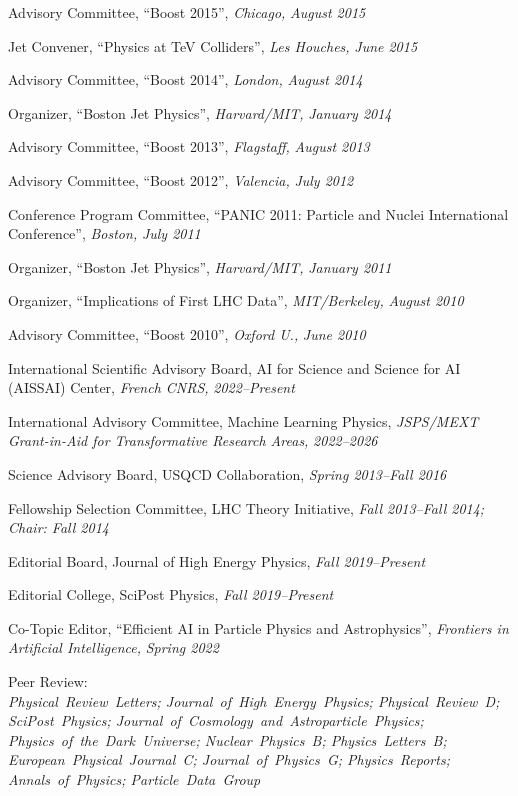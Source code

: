 \item Advisory Committee, ``Boost 2015'', \emph{Chicago, }\emph{August 2015}
\item Jet Convener, ``Physics at TeV Colliders'', \emph{Les Houches, }\emph{June 2015}
\item Advisory Committee, ``Boost 2014'', \emph{London, }\emph{August 2014}
\item Organizer, ``Boston Jet Physics'', \emph{Harvard/MIT, }\emph{January 2014}
\item Advisory Committee, ``Boost 2013'', \emph{Flagstaff, }\emph{August 2013}
\item Advisory Committee, ``Boost 2012'', \emph{Valencia, }\emph{July 2012}
\item Conference Program Committee, ``PANIC 2011: Particle and Nuclei International Conference'', \emph{Boston, }\emph{July 2011}
\item Organizer, ``Boston Jet Physics'', \emph{Harvard/MIT, }\emph{January 2011}
\item Organizer, ``Implications of First LHC Data'', \emph{MIT/Berkeley, }\emph{August 2010}
\item Advisory Committee, ``Boost 2010'', \emph{Oxford U., }\emph{June 2010}
\item International Scientific Advisory Board, AI for Science and Science for AI (AISSAI) Center, \emph{French CNRS, }\emph{2022--Present}
\item International Advisory Committee, Machine Learning Physics, \emph{JSPS/MEXT Grant-in-Aid for Transformative Research Areas, }\emph{2022--2026}
\item Science Advisory Board, USQCD Collaboration, \emph{Spring 2013--Fall 2016}
\item Fellowship Selection Committee, LHC Theory Initiative, \emph{Fall 2013--Fall 2014; Chair: Fall 2014}
\item Editorial Board, Journal of High Energy Physics, \emph{Fall 2019--Present}
\item Editorial College, SciPost Physics, \emph{Fall 2019--Present}
\item Co-Topic Editor, ``Efficient AI in Particle Physics and Astrophysics'', \emph{Frontiers in Artificial Intelligence, }\emph{Spring 2022}
\item \raggedright Peer Review: \\ \textit{\nohyphens{Physical~Review~Letters; Journal~of~High~Energy~Physics; Physical~Review~D; SciPost~Physics; Journal~of~Cosmology~and~Astroparticle~Physics; Physics~of~the~Dark~Universe; Nuclear~Physics~B; Physics~Letters~B; European~Physical~Journal~C; Journal~of~Physics~G; Physics~Reports; Annals~of~Physics; Particle~Data~Group}}
